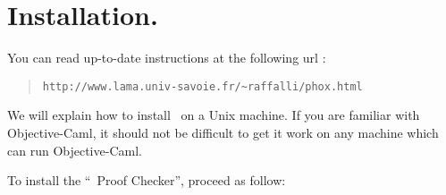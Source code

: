 \chapter{Installation.}\label{install}

You can read up-to-date
instructions at the following url :

\begin{quote}
 \verb#http://www.lama.univ-savoie.fr/~raffalli/phox.html#
\end{quote}

We will explain how to install \AFD\ on a Unix machine.  If you are
familiar with Objective-Caml, it should not be difficult to get it work
on any machine which can run Objective-Caml.

To install the ``\AFD\ Proof Checker'',  proceed as follow:

